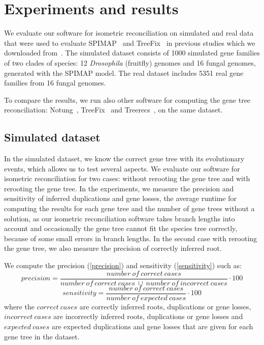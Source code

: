 \chapter{Experiments and results}

We evaluate our software for isometric reconciliation on simulated and real data that were used to evaluate SPIMAP~\cite{spimap} and TreeFix~\cite{treefix} in previous studies which we downloaded from~\cite{treefix_online}. The simulated dataset consists of 1000 simulated gene families of two clades of species: 12 \emph{Drosophila} (fruitfly) genomes and 16 fungal genomes, generated with the SPIMAP model. The real dataset includes 5351 real gene families from 16 fungal genomes.

To compare the results, we run also other software for computing the gene tree reconciliation: Notung~\cite{notung}, TreeFix~\cite{treefix} and Treerecs~\cite{treerecs}, on the same dataset.

\section{Simulated dataset}

In the simulated dataset, we know the correct gene tree with its evolutionary events, which allows us to test several aspects. We evaluate our software for isometric reconciliation for two cases: without rerooting the gene tree and with rerooting the gene tree. In the experiments, we measure the precision and sensitivity of inferred duplications and gene losses, the average runtime for computing the results for each gene tree and the number of gene trees without a solution, as our isometric reconciliation software takes branch lengths into account and occasionally the gene tree cannot fit the species tree correctly, because of some small errors in branch lengths. In the second case with rerooting the gene tree, we also measure the precision of correctly inferred root.

We compute the precision (\ref{precision}) and sensitivity (\ref{sensitivity}) such as:
\begin{equation}
\label{precision}
    precision = \frac{number\ of\ correct\ cases}{number\ of\ correct\ cases\ \cup\ number\ of\ incorrect\ cases} \cdot 100
\end{equation}
\begin{equation}
\label{sensitivity}
    sensitivity = \frac{number\ of\ correct\ cases}{number\ of\ expected\ cases} \cdot 100
\end{equation}
where the $correct\ cases$ are correctly inferred roots, duplications or gene losses, $incorrect\ cases$ are incorrectly inferred roots, duplications or gene losses and $expected\ cases$ are expected duplications and gene losses that are given for each gene tree in the dataset.

